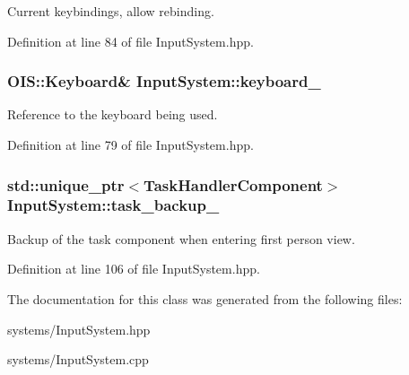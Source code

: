 Current keybindings, allow rebinding. 



Definition at line 84 of file Input\+System.\+hpp.

\subsubsection[{\texorpdfstring{keyboard\+\_\+}{keyboard_}}]{\setlength{\rightskip}{0pt plus 5cm}O\+I\+S\+::\+Keyboard\& Input\+System\+::keyboard\+\_\+\hspace{0.3cm}{\ttfamily [private]}}\hypertarget{class_input_system_a7b1e5fc521e98e9a4b0684fb1a9711c9}{}\label{class_input_system_a7b1e5fc521e98e9a4b0684fb1a9711c9}


Reference to the keyboard being used. 



Definition at line 79 of file Input\+System.\+hpp.

\subsubsection[{\texorpdfstring{task\+\_\+backup\+\_\+}{task_backup_}}]{\setlength{\rightskip}{0pt plus 5cm}std\+::unique\+\_\+ptr$<${\bf Task\+Handler\+Component}$>$ Input\+System\+::task\+\_\+backup\+\_\+\hspace{0.3cm}{\ttfamily [private]}}\hypertarget{class_input_system_af5cf64f0c19712f6f792cfd75d247ad1}{}\label{class_input_system_af5cf64f0c19712f6f792cfd75d247ad1}


Backup of the task component when entering first person view. 



Definition at line 106 of file Input\+System.\+hpp.



The documentation for this class was generated from the following files\+:\begin{DoxyCompactItemize}
\item 
systems/Input\+System.\+hpp\item 
systems/Input\+System.\+cpp\end{DoxyCompactItemize}
